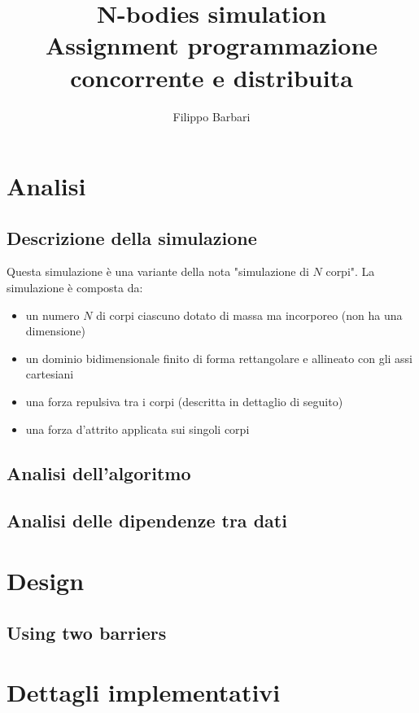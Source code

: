 \documentclass[12pt,a4paper,oneside,draft]{article}
\begin{document}
	
	\title{N-bodies simulation\\Assignment programmazione concorrente e distribuita}
	\author{Filippo Barbari}
	\date{}%
	\maketitle
	
	\tableofcontents
	\newpage
	
	\section{Analisi}
	\subsection{Descrizione della simulazione}
	Questa simulazione è una variante della nota "simulazione di $N$ corpi". La simulazione è composta da:
	\begin{itemize}
		\item un numero $N$ di corpi ciascuno dotato di massa ma incorporeo (non ha una dimensione)
		\item un dominio bidimensionale finito di forma rettangolare e allineato con gli assi cartesiani
		\item una forza repulsiva tra i corpi (descritta in dettaglio di seguito)
		\item una forza d'attrito applicata sui singoli corpi
	\end{itemize}
	
	\subsection{Analisi dell'algoritmo}
	\subsection{Analisi delle dipendenze tra dati}
	
	\section{Design}
	\subsection{Using two barriers}
	
	\section{Dettagli implementativi}
	
\end{document}
